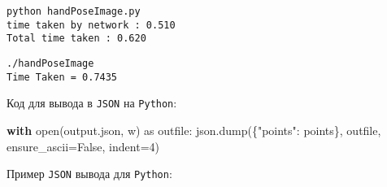 \documentclass[
  12pt,
  a4paper,
]{article}
\newenvironment{Shaded}{}{}
\newcommand{\BuiltInTok}[1]{#1}
\newcommand{\ControlFlowTok}[1]{\textcolor[rgb]{0.00,0.44,0.13}{\textbf{#1}}}
\newcommand{\DecValTok}[1]{\textcolor[rgb]{0.25,0.63,0.44}{#1}}
\newcommand{\ImportTok}[1]{#1}
\newcommand{\NormalTok}[1]{#1}
\newcommand{\OperatorTok}[1]{\textcolor[rgb]{0.40,0.40,0.40}{#1}}
\newcommand{\StringTok}[1]{\textcolor[rgb]{0.25,0.44,0.63}{#1}}
\newcommand{\VariableTok}[1]{\textcolor[rgb]{0.10,0.09,0.49}{#1}}
\begin{document}
\begin{verbatim}
python handPoseImage.py
time taken by network : 0.510
Total time taken : 0.620
\end{verbatim}

\begin{verbatim}
./handPoseImage
Time Taken = 0.7435
\end{verbatim}

Код для вывода в \texttt{JSON} на \texttt{Python}:

\begin{Shaded}
\begin{Highlighting}[]
\ControlFlowTok{with} \BuiltInTok{open}\NormalTok{(}\StringTok{\textquotesingle{}output.json\textquotesingle{}}\NormalTok{, }\StringTok{\textquotesingle{}w\textquotesingle{}}\NormalTok{) }\ImportTok{as}\NormalTok{ outfile:}
\NormalTok{    json.dump(\{}\StringTok{"points"}\NormalTok{: points\}, outfile, ensure\_ascii}\OperatorTok{=}\VariableTok{False}\NormalTok{, indent}\OperatorTok{=}\DecValTok{4}\NormalTok{)}
\end{Highlighting}
\end{Shaded}

Пример \texttt{JSON} вывода для \texttt{Python}:
\end{document}
